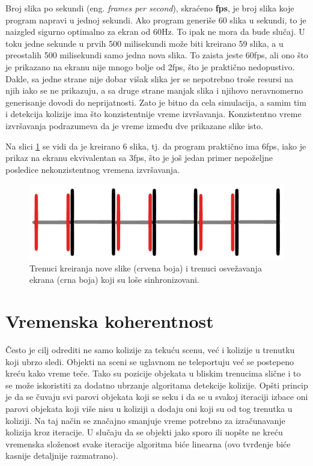 \documentclass[12pt,oneside]{memoir}
\begin{document}
Broj slika po sekundi (eng. {\em frames per second}), skraćeno \textbf{fps}, je broj slika koje program napravi u jednoj sekundi.
Ako program generiše 60 slika u sekundi, to je naizgled sigurno optimalno za ekran od 60Hz.
To ipak ne mora da bude slučaj.
U toku jedne sekunde u prvih 500 milisekundi može biti kreirano 59 slika, a u preostalih 500 milisekundi samo jedna nova slika. 
To zaista jeste 60fps, ali ono što je prikazano na ekranu nije mnogo bolje od 2fps, 
što je praktično nedopustivo. 
Dakle, sa jedne strane nije dobar višak slika jer se nepotrebno troše resursi na njih iako se ne prikazuju, 
a sa druge strane manjak slika i njihovo neravnomerno generisanje dovodi do neprijatnosti.
Zato je bitno da cela simulacija, a samim tim i detekcija kolizije ima što konzistentnije vreme izvršavanja.
Konzistentno vreme izvršavanja podrazumeva da je vreme između dve prikazane slike isto.

Na slici \ref{fig:fpsdiv2} se vidi da je kreirano 6 slika, tj. da program praktično ima 6fps, iako je prikaz na ekranu 
ekvivalentan sa 3fps, što je još jedan primer nepoželjne posledice nekonzistentnog vremena izvršavanja. 

\begin{figure}[h!]
	\centering
	\includegraphics[scale=0.5]{fpsdiv2.png}
	\caption{ Trenuci kreiranja nove slike (crvena boja) i trenuci osvežavanja ekrana (crna boja) koji su loše sinhronizovani. }
	\label{fig:fpsdiv2}
\end{figure}

\section{Vremenska koherentnost}

Često je cilj odrediti ne samo kolizije za tekuću scenu, već i kolizije u trenutku koji ubrzo sledi.
Objekti na sceni se uglavnom ne teleportuju već se postepeno kreću kako vreme teče.
Tako su pozicije objekata u bliskim trenucima slične i to se može iskoristiti za dodatno ubrzanje algoritama detekcije kolizije. 
Opšti princip je da se čuvaju svi parovi objekata koji se seku i da se u svakoj iteraciji 
izbace oni parovi objekata koji više nisu u koliziji a dodaju oni koji su od tog trenutka u koliziji.
Na taj način se značajno smanjuje vreme potrebno za izračunavanje kolizija kroz iteracije.
U slučaju da se objekti jako sporo ili uopšte ne kreću 
vremenska složenost svake iteracije algoritma biće linearna (ovo tvrđenje biće kasnije detaljnije razmatrano).
\end{document}
